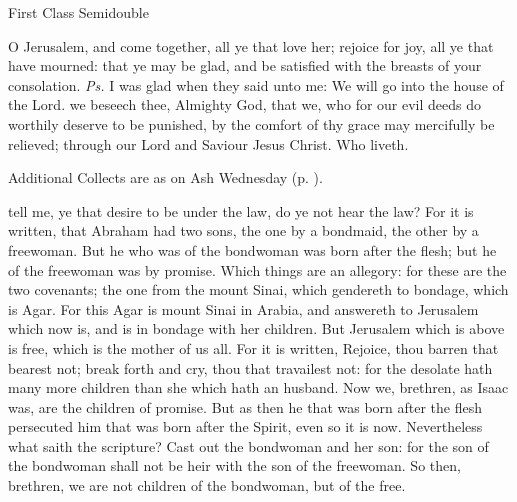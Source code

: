 \begin{inhead}
{First Class Semidouble}
\end{inhead}
\par\noindent
{}



\properantiphonfix

\introit
{} O Jerusalem, and come together, all ye that love her; rejoice for joy, all ye that have mourned: that ye may be glad, and be satisfied with the breasts of your consolation. \textit{Ps.} I was glad when they said unto me: We will go into the house of the Lord.
\collect
{} we beseech thee, Almighty God, that we, who for our evil deeds do worthily deserve to be punished, by the comfort of thy grace may mercifully be relieved; through our Lord and Saviour Jesus Christ. Who liveth.
\begin{rubric}
    Additional Collects are as on Ash Wednesday (p. \pageref{AshWednesdayMassCollect}).
\end{rubric}
 tell me, ye that desire to be under the law, do ye not hear the law? For it is written, that Abraham had two sons, the one by a bondmaid, the other by a freewoman. But he who was of the bondwoman was born after the flesh; but he of the freewoman was by promise. Which things are an allegory: for these are the two covenants; the one from the mount Sinai, which gendereth to bondage, which is Agar. For this Agar is mount Sinai in Arabia, and answereth to Jerusalem which now is, and is in bondage with her children. But Jerusalem which is above is free, which is the mother of us all. For it is written, Rejoice, thou barren that bearest not; break forth and cry, thou that travailest not: for the desolate hath many more children than she which hath an husband. Now we, brethren, as Isaac was, are the children of promise. But as then he that was born after the flesh persecuted him that was born after the Spirit, even so it is now. Nevertheless what saith the scripture? Cast out the bondwoman and her son: for the son of the bondwoman shall not be heir with the son of the freewoman. So then, brethren, we are not children of the bondwoman, but of the free.

